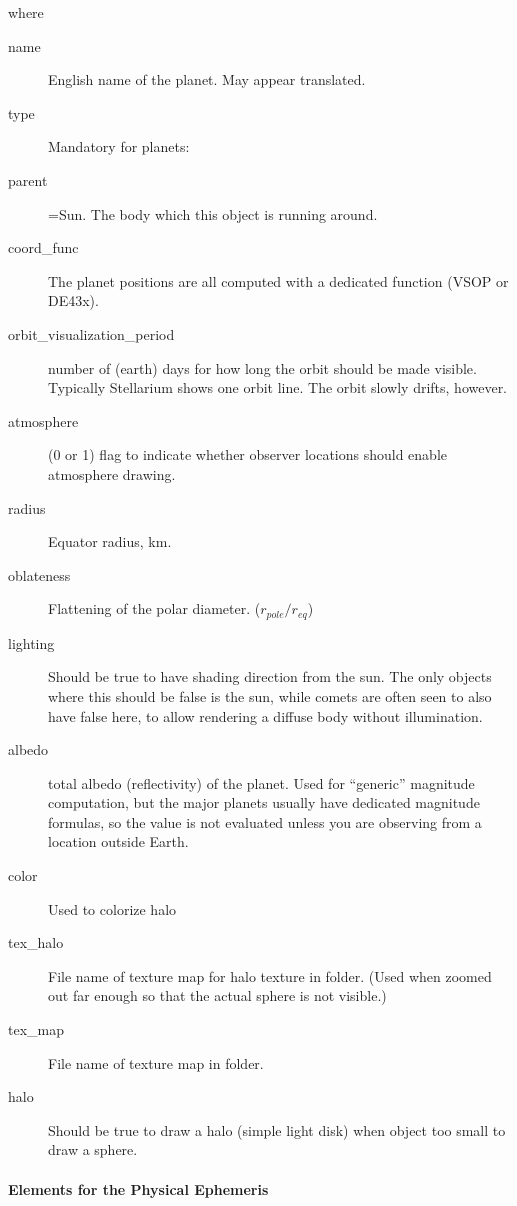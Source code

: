where 
\begin{description}
\item[name] English name of the planet. May appear translated. 
\item[type] Mandatory for planets: \value{planet}
\item[parent]=Sun. The body which this object is running around.
\item[coord\_func] The planet positions are all computed with a dedicated function (VSOP or DE43x). 
\item[orbit\_visualization\_period] number of (earth) days for how
  long the orbit should be made visible. Typically Stellarium shows
  one orbit line. The orbit slowly drifts, however.

\item[atmosphere] (0 or 1) flag to indicate whether observer locations should enable atmosphere drawing.

\item[radius] Equator radius, km.
\item[oblateness] Flattening of the polar diameter. ($r_{pole}/r_{eq}$)
\item[lighting] Should be true to have shading direction from the
  sun. The only objects where this should be false is the sun, while
  comets are often seen to also have false here, to allow rendering a
  diffuse body without illumination.
\item[albedo] total albedo (reflectivity) of the planet. Used for ``generic''
  magnitude computation, but the major planets usually have dedicated
  magnitude formulas, so the value is not evaluated unless you are
  observing from a location outside Earth.
\item[color] Used to colorize halo 
\item[tex\_halo] File name of texture map for halo texture in
   folder. (Used when zoomed out far enough so that the
  actual sphere is not visible.)
\item[tex\_map] File name of texture map in  folder.
\item[halo] Should be true to draw a halo (simple light disk) when object too small to draw a sphere.
\end{description}

\paragraph{Elements for the Physical Ephemeris}


